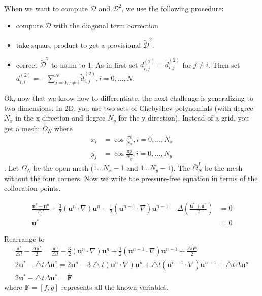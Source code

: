 \documentclass[12pt]{article}
\begin{document}
When we want to compute $\mathcal{D}$ and $\mathcal{D}^2$, we use the following procedure:
\begin{itemize}
    \item compute $\mathcal{D}$ with the diagonal term correction
    \item take square product to get a provisional $\tilde{\mathcal{D}}^2$.
    \item correct $\tilde{\mathcal{D}}^2$ to nsum to 1. As in first set $d^{(2)}_{i,j} = \tilde{d}^{(2)}_{i,j}$ for $j \neq i$. Then set $d^{(2)}_{i,i} = -\sum_{j=0, j\neq i}^{N} \tilde{d}^{(2)}_{i,j}, i = 0,..., N$.
\end{itemize}

Ok, now that we know how to differentiate, the next challenge is generalizing to two dimensions. In 2D, you use two sets of Chebyshev polynomials (with degree $N_x$ in the x-direction and degree $N_y$ for the y-direction). Instead of a grid, you get a mesh:
$\bar{\Omega}_N$ where
\begin{align*}
    x_i &= \cos \frac{\pi i}{N_x}, i = 0, ..., N_x \\
    y_j &= \cos \frac{\pi j}{N_y}, i = 0, ..., N_y
\end{align*}
. Let $\Omega_N$ be the open mesh ($1...N_x-1$ and $1...N_y-1$). The $\bar{\Omega}^I_N$ be the mesh without the four corners. Now we write the pressure-free equation in terms of the collocation points.

\begin{align*}
    \frac{\mathbf{u}^{*} - \mathbf{u}^n}{\bigtriangleup t} + \frac{3}{2}(\mathbf{u}^n \cdot \nabla)\mathbf{u}^n - \frac{1}{2}(\mathbf{u}^{n-1} \cdot \nabla)\mathbf{u}^{n-1} - \Delta(\frac{\mathbf{u}^{*} + \mathbf{u}^n}{2}) &= 0 \\
    \mathbf{u}^{*} &= 0
\end{align*}

Rearrange to
\begin{align*}
\frac{\mathbf{u}^*}{{\bigtriangleup t}} - \frac{\Delta \mathbf{u}^*}{2} = \frac{\mathbf{u}^n}{\bigtriangleup t} - \frac{3}{2}(\mathbf{u}^n \cdot \nabla)\mathbf{u}^n + \frac{1}{2}(\mathbf{u}^{n-1} \cdot \nabla)\mathbf{u}^{n-1} + \frac{\Delta \mathbf{u}^n}{2} \\
2\mathbf{u}^* - \bigtriangleup t \Delta \mathbf{u}^* = 2\mathbf{u}^n - 3\bigtriangleup t(\mathbf{u}^n \cdot \nabla)\mathbf{u}^n + \bigtriangleup t(\mathbf{u}^{n-1} \cdot \nabla)\mathbf{u}^{n-1} + \bigtriangleup t\Delta \mathbf{u}^n \\
2\mathbf{u}^* - \bigtriangleup t \Delta \mathbf{u}^* = \mathbf{F}
\end{align*}
where $\mathbf{F} = [f, g]$ represents all the known variables.
\end{document}
